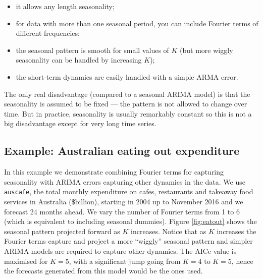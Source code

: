 \documentclass[]{book}
\providecommand{\tightlist}{%
  \setlength{\itemsep}{0pt}\setlength{\parskip}{0pt}}
\begin{document}
\begin{itemize}
\tightlist
\item
  it allows any length seasonality;
\item
  for data with more than one seasonal period, you can include Fourier terms of different frequencies;
\item
  the seasonal pattern is smooth for small values of \(K\) (but more wiggly seasonality can be handled by increasing \(K\));
\item
  the short-term dynamics are easily handled with a simple ARMA error.
\end{itemize}

The only real disadvantage (compared to a seasonal ARIMA model) is that the seasonality is assumed to be fixed --- the pattern is not allowed to change over time. But in practice, seasonality is usually remarkably constant so this is not a big disadvantage except for very long time series.

\hypertarget{example-australian-eating-out-expenditure}{%
\subsection*{Example: Australian eating out expenditure}\label{example-australian-eating-out-expenditure}}

In this example we demonstrate combining Fourier terms for capturing seasonality with ARIMA errors capturing other dynamics in the data. We use \texttt{auscafe}, the total monthly expenditure on cafes, restaurants and takeaway food services in Australia (\$billion), starting in 2004 up to November 2016 and we forecast 24 months ahead. We vary the number of Fourier terms from 1 to 6 (which is equivalent to including seasonal dummies). Figure \ref{fig:eatout} shows the seasonal pattern projected forward as \(K\) increases. Notice that as \(K\) increases the Fourier terms capture and project a more ``wiggly'' seasonal pattern and simpler ARIMA models are required to capture other dynamics. The AICc value is maximised for \(K=5\), with a significant jump going from \(K=4\) to \(K=5\), hence the forecasts generated from this model would be the ones used.
\end{document}

